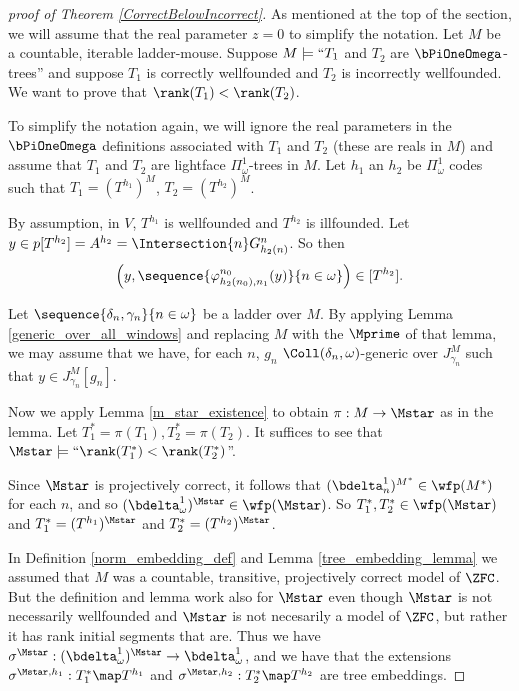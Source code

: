\documentclass[oneside,12pt]{amsart}
\begin{document}
\begin{proof}[proof of Theorem \ref{CorrectBelowIncorrect}]
As mentioned at the top of the section, we will assume that the real parameter
$z=0$ to simplify the notation.
Let $M$ be a countable, iterable ladder-mouse.
Suppose $M\models ``T_1$ and $T_2$ are $\bPiOneOmega$-trees'' and
suppose $T_1$ is correctly wellfounded and
$T_2$ is incorrectly wellfounded. We want to prove that
$\rank(T_1) < \rank(T_2)$.

To simplify the notation again, we will ignore the real parameters
in the
$\bPiOneOmega$ definitions associated with $T_1$ and $T_2$
(these are reals in $M$)
and assume that
$T_1$ and $T_2$ are lightface $\Pi^1_{\omega}$-trees in $M$.
Let $h_1$ an $h_2$ be $\Pi^1_{\omega}$
codes such that $T_1=(T^{h_1})^M$, $T_2=(T^{h_2})^M$.

By assumption, in $V$, $T^{h_1}$ is wellfounded and $T^{h_2}$ is illfounded. Let
$y\in p[T^{h_2}] = A^{h_2} = \Intersection{n} G^n_{h_2(n)}$.
So then
$$\left(y,\sequence{\varphi^{n_0}_{h_2(n_0),n_1}(y)}{n\in\omega} \right)\in[T^{h_2}].$$

Let $\sequence{\delta_n,\gamma_n}{n\in\omega}$ be a ladder over $M$.
By applying Lemma \ref{generic_over_all_windows} and replacing $M$ with the $\Mprime$ of
that lemma, we may assume that we have, for each $n$, $g_n$
$\Coll(\delta_n,\omega)$-generic over $J^M_{\gamma_n}$ such that $y\in J^M_{\gamma_n}[g_n]$.

Now we apply Lemma \ref{m_star_existence} to obtain $\pi:M\to\Mstar$ as in
the lemma.
Let $T_1^* = \pi(T_1), T_2^* = \pi(T_2)$.
It suffices to see that $\Mstar\models\text{``}\rank(T_1^*) < \rank(T_2^*)$''.

Since $\Mstar$ is projectively correct, it follows that $(\bdelta^1_n)^{M^*}\in\wfp(M^*)$
for each $n$, and so $(\bdelta^1_{\omega})^{\Mstar}\in\wfp(\Mstar)$. So
$T_1^*,T_2^*\in\wfp(\Mstar)$ and $T_1^* = (T^{h_1})^{\Mstar}$
and $T_2^* = (T^{h_2})^{\Mstar}$.

In Definition \ref{norm_embedding_def} and
Lemma \ref{tree_embedding_lemma} we assumed that $M$ was a countable, transitive, projectively correct model of $\ZFC$. But the definition and lemma work also for $\Mstar$ even though $\Mstar$ is not
necessarily wellfounded and $\Mstar$ is not necesarily a model of $\ZFC$, but rather it has
rank initial segments that are. Thus we have
$\sigma^{\Mstar}:(\bdelta^1_{\omega})^{\Mstar}\to\bdelta^1_{\omega}$, and
we have that the extensions
$\sigma^{\Mstar,h_1}:T_1^*\map T^{h_1}$ and $\sigma^{\Mstar,h_2}:T_2^*\map T^{h_2}$ are tree
embeddings.


\end{proof}
\end{document}
